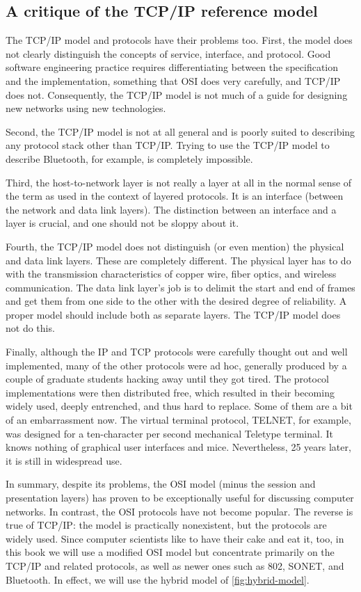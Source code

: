 \subsection{A critique of the TCP/IP reference model}

The TCP/IP model and protocols have their problems too.
First, the model does not clearly distinguish the concepts of service, interface, and
protocol. Good software engineering practice requires differentiating
between the specification and the implementation, something that OSI
does very carefully, and TCP/IP does not. Consequently, the TCP/IP model
is not much of a guide for designing new networks using new
technologies.

Second, the TCP/IP model is not at all general and is poorly suited to
describing any protocol stack other than TCP/IP. Trying to use the
TCP/IP model to describe Bluetooth, for example, is completely
impossible.

Third, the host-to-network layer is not really a layer at all in the
normal sense of the term as used in the context of layered protocols. It
is an interface (between the network and data link layers). The
distinction between an interface and a layer is crucial, and one should
not be sloppy about it.

Fourth, the TCP/IP model does not distinguish (or even mention) the
physical and data link layers. These are completely different. The
physical layer has to do with the transmission characteristics of copper
wire, fiber optics, and wireless communication. The data link layer's
job is to delimit the start and end of frames and get them from one side
to the other with the desired degree of reliability. A proper model
should include both as separate layers. The TCP/IP model does not do
this.

Finally, although the IP and TCP protocols were carefully thought out
and well implemented, many of the other protocols were ad hoc, generally
produced by a couple of graduate students hacking away until they got
tired. The protocol implementations were then distributed free, which
resulted in their becoming widely used, deeply entrenched, and thus hard
to replace. Some of them are a bit of an embarrassment now. The virtual
terminal protocol, TELNET, for example, was designed for a ten-character
per second mechanical Teletype terminal. It knows nothing of graphical
user interfaces and mice. Nevertheless, 25 years later, it is still in
widespread use.

In summary, despite its problems, the OSI {model} (minus the session and
presentation layers) has proven to be exceptionally useful for
discussing computer networks. In contrast, the OSI {protocols} have not
become popular. The reverse is true of TCP/IP: the {model} is
practically nonexistent, but the {protocols} are widely used. Since
computer scientists like to have their cake and eat it, too, in this
book we will use a modified OSI model but concentrate primarily on the
TCP/IP and related protocols, as well as newer ones such as 802, SONET,
and Bluetooth.
In effect, we will use the hybrid model of \cref{fig:hybrid-model}.


